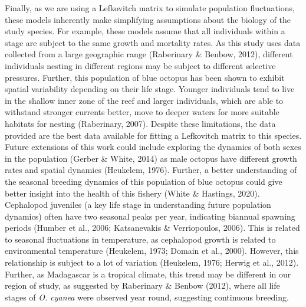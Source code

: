 \documentclass[
]{article}
\begin{document}
Finally, as we are using a Lefkovitch matrix to simulate population fluctuations, these models inherently make simplifying assumptions about the biology of the study species. For example, these models assume that all individuals within a stage are subject to the same growth and mortality rates. As this study uses data collected from a large geographic range (Raberinary \& Benbow, 2012), different individuals nesting in different regions may be subject to different selective pressures. Further, this population of blue octopus has been shown to exhibit spatial variability depending on their life stage. Younger individuals tend to live in the shallow inner zone of the reef and larger individuals, which are able to withstand stronger currents better, move to deeper waters for more suitable habitats for nesting (Raberinary, 2007). Despite these limitations, the data provided are the best data available for fitting a Lefkovitch matrix to this species. Future extensions of this work could include exploring the dynamics of both sexes in the population (Gerber \& White, 2014) as male octopus have different growth rates and spatial dynamics (Heukelem, 1976). Further, a better understanding of the seasonal breeding dynamics of this population of blue octopus could give better insight into the health of this fishery (White \& Hastings, 2020). Cephalopod juveniles (a key life stage in understanding future population dynamics) often have two seasonal peaks per year, indicating biannual spawning periods (Humber et al., 2006; Katsanevakis \& Verriopoulos, 2006). This is related to seasonal fluctuations in temperature, as cephalopod growth is related to environmental temperature (Heukelem, 1973; Domain et al., 2000). However, this relationship is subject to a lot of variation (Heukelem, 1976; Herwig et al., 2012). Further, as Madagascar is a tropical climate, this trend may be different in our region of study, as suggested by Raberinary \& Benbow (2012), where all life stages of \emph{O. cyanea} were observed year round, suggesting continuous breeding.
\end{document}

